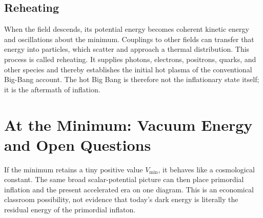 \subsection{Reheating}

When the field descends, its potential energy becomes coherent kinetic energy and oscillations about the minimum. Couplings to other fields can transfer that energy into particles, which scatter and approach a thermal distribution. This process is called reheating. It supplies photons, electrons, positrons, quarks, and other species and thereby establishes the initial hot plasma of the conventional Big-Bang account. The hot Big Bang is therefore not the inflationary state itself; it is the aftermath of inflation.

\begin{classroomqa}
\end{classroomqa}

\begin{classroomqa}
\end{classroomqa}

\section{At the Minimum: Vacuum Energy and Open Questions}

If the minimum retains a tiny positive value \(V_{\min}\), it behaves like a cosmological constant. The same broad scalar-potential picture can then place primordial inflation and the present accelerated era on one diagram. This is an economical classroom possibility, not evidence that today's dark energy is literally the residual energy of the primordial inflaton.

